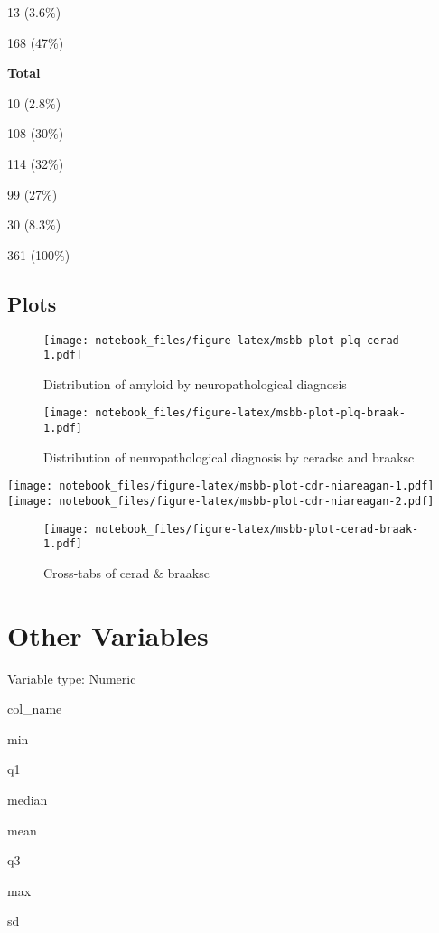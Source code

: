 \documentclass[]{book}
\begin{document}
13 (3.6\%)

168 (47\%)

\textbf{Total}

10 (2.8\%)

108 (30\%)

114 (32\%)

99 (27\%)

30 (8.3\%)

361 (100\%)

\hypertarget{plots-6}{%
\subsection{Plots}\label{plots-6}}

\begin{figure}
\centering
\texttt{[image: notebook\_files/figure-latex/msbb-plot-plq-cerad-1.pdf]}
\caption{\label{fig:msbb-plot-plq-cerad}Distribution of amyloid by neuropathological diagnosis}
\end{figure}

\begin{figure}
\centering
\texttt{[image: notebook\_files/figure-latex/msbb-plot-plq-braak-1.pdf]}
\caption{\label{fig:msbb-plot-plq-braak}Distribution of neuropathological diagnosis by ceradsc and braaksc}
\end{figure}

\texttt{[image: notebook\_files/figure-latex/msbb-plot-cdr-niareagan-1.pdf]} \texttt{[image: notebook\_files/figure-latex/msbb-plot-cdr-niareagan-2.pdf]}

\begin{figure}
\centering
\texttt{[image: notebook\_files/figure-latex/msbb-plot-cerad-braak-1.pdf]}
\caption{\label{fig:msbb-plot-cerad-braak}Cross-tabs of cerad \& braaksc}
\end{figure}

\hypertarget{other-variables}{%
\section{Other Variables}\label{other-variables}}

\label{tab:msbb-numeric}Variable type: Numeric

col\_name

min

q1

median

mean

q3

max

sd
\end{document}
